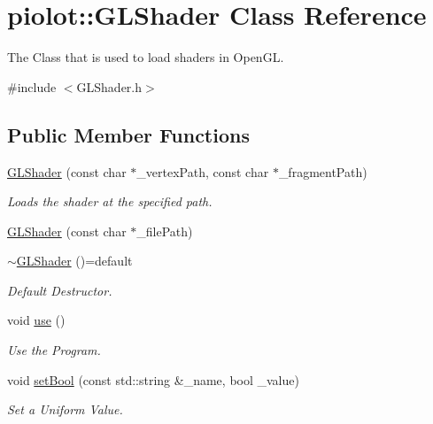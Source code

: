 \hypertarget{classpiolot_1_1_g_l_shader}{}\section{piolot\+:\+:G\+L\+Shader Class Reference}
\label{classpiolot_1_1_g_l_shader}


The Class that is used to load shaders in Open\+GL.  




{\ttfamily \#include $<$G\+L\+Shader.\+h$>$}

\subsection*{Public Member Functions}
\begin{DoxyCompactItemize}
\item 
\mbox{\hyperlink{classpiolot_1_1_g_l_shader_a9280ae5003e53461f898dd18b7685eab}{G\+L\+Shader}} (const char $\ast$\+\_\+vertex\+Path, const char $\ast$\+\_\+fragment\+Path)
\begin{DoxyCompactList}\small\item\em Loads the shader at the specified path. \end{DoxyCompactList}\item 
\mbox{\hyperlink{classpiolot_1_1_g_l_shader_a1ed833e8b2ade593d5c820981121bfbb}{G\+L\+Shader}} (const char $\ast$\+\_\+file\+Path)
\item 
\mbox{\hyperlink{classpiolot_1_1_g_l_shader_a7bf14037e4f1f1e5b6af344da08d6430}{$\sim$\+G\+L\+Shader}} ()=default
\begin{DoxyCompactList}\small\item\em Default Destructor. \end{DoxyCompactList}\item 
void \mbox{\hyperlink{classpiolot_1_1_g_l_shader_a624427668ba51101fe898e12731069bf}{use}} ()
\begin{DoxyCompactList}\small\item\em Use the Program. \end{DoxyCompactList}\item 
void \mbox{\hyperlink{classpiolot_1_1_g_l_shader_a8f3349b73adbb3f7d85b847ffc39d0f3}{set\+Bool}} (const std\+::string \&\+\_\+name, bool \+\_\+value)
\begin{DoxyCompactList}\small\item\em Set a Uniform Value. \end{DoxyCompactList}\item 

\end{DoxyCompactItemize}
